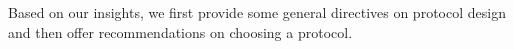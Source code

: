 

Based on our insights, we first provide some general directives on protocol design and then offer recommendations on choosing a protocol.

